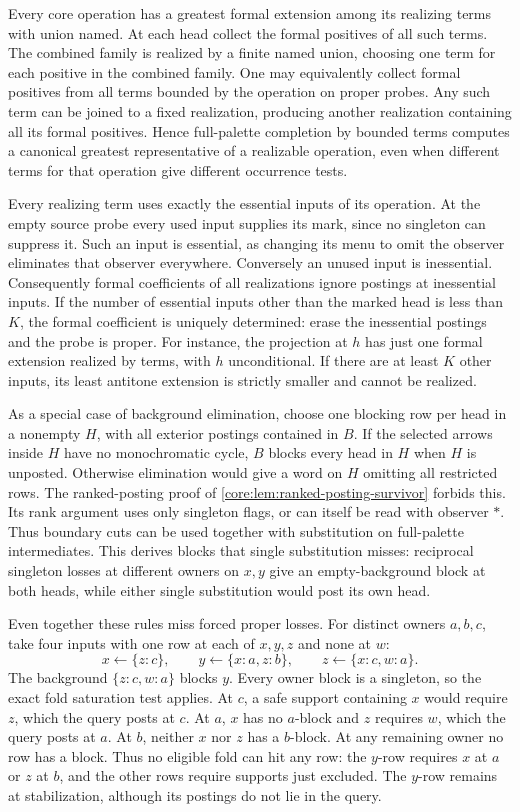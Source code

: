 Every core operation has a greatest formal
extension among its realizing terms with union
named. At each head collect the formal positives
of all such terms. The combined family is
realized by a finite named union, choosing
one term for each positive in the combined
family. One may equivalently collect formal
positives from all terms bounded by the
operation on proper probes. Any such term
can be joined to a fixed realization, producing
another realization containing all its formal
positives. Hence full-palette completion by
bounded terms computes a canonical greatest
representative of a realizable operation,
even when different terms for that operation
give different occurrence tests.

Every realizing term uses exactly the essential
inputs of its operation. At the empty source
probe every used input supplies its mark, since
no singleton can suppress it. Such an input is
essential, as changing its menu to omit the
observer eliminates that observer everywhere.
Conversely an unused input is inessential.
Consequently formal coefficients of all
realizations ignore postings at inessential
inputs. If the number of essential inputs
other than the marked head is less than $K$,
the formal coefficient is uniquely determined:
erase the inessential postings and the probe
is proper. For instance, the projection at
$h$ has just one formal extension realized by
terms, with $h$ unconditional. If there are
at least $K$ other inputs, its least antitone
extension is strictly smaller and cannot be
realized.

As a special case of background elimination,
choose one blocking row per head
in a nonempty $H$, with all exterior postings
contained in $B$. If the selected arrows inside $H$
have no monochromatic cycle, $B$ blocks every head
in $H$ when $H$ is unposted. Otherwise elimination
would give a word on $H$ omitting all restricted rows.
The ranked-posting proof of
\cref{core:lem:ranked-posting-survivor} forbids this.
Its rank argument uses only singleton flags, or can
itself be read with observer $*$.
Thus boundary cuts can be used together with substitution
on full-palette intermediates. This derives blocks that
single substitution misses: reciprocal singleton losses
at different owners on $x,y$ give an empty-background
block at both heads, while either single substitution
would post its own head.

Even together these rules miss forced proper losses. For distinct
owners $a,b,c$, take four inputs with one row at each of $x,y,z$
and none at $w$:
\[
 x\gets\{z:c\},\qquad
 y\gets\{x:a,z:b\},\qquad
 z\gets\{x:c,w:a\}.
\]
The background $\{z:c,w:a\}$ blocks $y$. Every owner block is a
singleton, so the exact fold saturation test applies. At $c$, a
safe support containing $x$ would require $z$, which the query
posts at $c$. At $a$, $x$ has no $a$-block and $z$ requires $w$,
which the query posts at $a$. At $b$, neither $x$ nor $z$ has a
$b$-block. At any remaining owner no row has a block. Thus no
eligible fold can hit any row: the $y$-row requires $x$ at $a$
or $z$ at $b$, and the other rows require supports just excluded.
The $y$-row remains at stabilization, although its postings do
not lie in the query.

